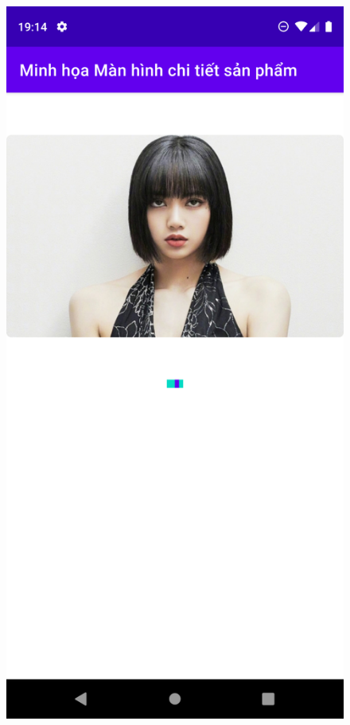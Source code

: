 \documentclass{beamer}
\begin{document}
\begin{frame}
    \begin{columns}
        \begin{figure}
            \centering
            \includegraphics[height=0.7\textheight]{images/34.png}

\end{figure}
\end{columns}
\end{frame}
\end{document}
